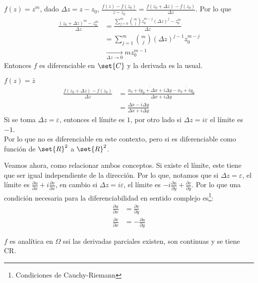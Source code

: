 \documentclass{notetaking}
\begin{document}
\begin{ejm}
    \(f(z)=z^m\), dado \(\Delta z=z-z_0\), \(\frac{f(z)-f(z_0)}{z-z_0}=\frac{f(z_0+\Delta z)-f(z_0)}{\Delta z}\). Por lo que
    \begin{align*}
        \frac{(z_0+\Delta z)^m-z_0^m}{\Delta z} & =\frac{\sum_{j=0}^m\binom{m}{j}z_0^{m-j}(\Delta z)^j-z_0^m}{\Delta z}\\
        &=\sum_{j=1}^m\binom{m}{j}(\Delta z)^{j-1}z_0^{m-j}\\
        &\xrightarrow[\Delta z\rightarrow 0]{}mz_0^{m-1}
    \end{align*}
    Entonces \(f\) es diferenciable en \(\set{C}\) y la derivada es la usual.
\end{ejm}

\begin{ejm}
    \(f(z)=\bar{z}\)
    \begin{align*}
        \frac{f(z_0+\Delta z)-f(z_0)}{\Delta z} &= \frac{\overline{x_0+iy_0+\Delta x+i\Delta y}-\overline{x_0+iy_0}}{\Delta x+i\Delta y}\\
        &= \frac{\Delta x-i\Delta y}{\Delta x+i\Delta y}
    \end{align*}
    Si se toma \(\Delta z=\varepsilon\), entonces el límite es \(1\), por otro lado si \(\Delta z=i\varepsilon\) el límite es \(-1\).\\
    Por lo que no es diferenciable en este contexto, pero si es diferenciable como función de \(\set{R}^2\) a \(\set{R}^2\).
\end{ejm}

Veamos ahora, como relacionar ambos conceptos. Si existe el límite, este tiene que ser igual independiente de la dirección. Por lo que, notamos que si \(\Delta z=\varepsilon\), el límite es \(\frac{\partial u}{\partial x}+i\frac{\partial v}{\partial x}\), en cambio si \(\Delta z=i\varepsilon\), el límite es \(-i\frac{\partial u}{\partial y}+\frac{\partial v}{\partial y}\). Por lo que una condición necesaria para la diferenciabilidad en sentido complejo es\footnote{Condiciones de Cauchy-Riemann}:
\begin{align*}
    \frac{\partial u}{\partial x}&=\frac{\partial v}{\partial y}\\
    \frac{\partial v}{\partial x}&=-\frac{\partial u}{\partial y}
\end{align*}

\begin{thm}
    \(f\) es analítica en \(\Omega\) ssi las derivadas parciales existen, son continuas y se tiene CR.
\end{thm}
\end{document}
